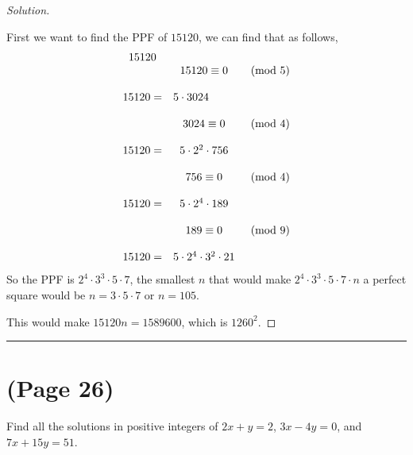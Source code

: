 \documentclass[11pt]{article}
\newcommand{\bline}{\noindent\rule[0.5ex]{\linewidth}{1pt}}
\newenvironment{problem}[2][Problem]{\begin{trivlist}
\item[\hskip \labelsep {\bfseries #1}\hskip \labelsep {\bfseries #2.}]}{\end{trivlist}}
\newenvironment{solution}
  {\renewcommand\qedsymbol{$~$}\begin{proof}[Solution]$ $\par\nobreak\ignorespaces}
  {\end{proof}}
\begin{document}
\begin{solution}
    First we want to find the PPF of $15120$, we can find that as follows,
    \[
        \begin{matrix}
            15120   &                                           &          \\
                    & 15120                      \equiv 0       & \pmod{5} \\
            \\
            15120 = & \multicolumn{2}{l}{5 \cdot 3024}                     \\
            \\
                    & 3024                             \equiv 0 & \pmod{4} \\
            \\
            15120 = & 5 \cdot 2^2 \cdot 756                     &          \\
            \\
                    & 756                             \equiv 0  & \pmod{4} \\
            \\

            15120 = & 5 \cdot 2^4 \cdot 189                                \\
            \\
                    & 189                             \equiv 0  & \pmod{9} \\
            \\
            15120 = & 5 \cdot 2^4 \cdot 3^2 \cdot 21                       \\
        \end{matrix}
    \]
    So the PPF is $2^4 \cdot 3^3 \cdot 5\cdot 7$, the smallest $n$ that would make $2^4 \cdot 3^3 \cdot 5\cdot 7\cdot n$ a perfect square would be $n=3\cdot 5 \cdot 7$ or $n=105$.

    This would make $15120n = 1589600$, which is $1260^2$.
\end{solution}


\bline
\section{(Page 26)}

\begin{problem}{4}
Find all the solutions in positive integers of $2x+y=2$, $3x-4y=0$, and $7x+15y=51$.
\end{problem}
\end{document}
